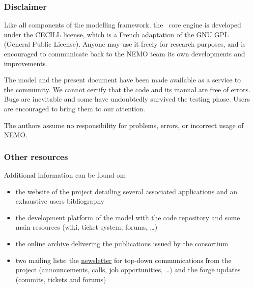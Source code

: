 
\thispagestyle{plain}

\subsubsection*{Disclaimer}

Like all components of the modelling framework,
the \engine~core engine is developed under the \href{http://www.cecill.info}{CECILL license},
which is a French adaptation of the GNU GPL (General Public License).
Anyone may use it freely for research purposes, and is encouraged to
communicate back to the NEMO team its own developments and improvements.

The model and the present document have been made available as a service to the community.
We cannot certify that the code and its manual are free of errors.
Bugs are inevitable and some have undoubtedly survived the testing phase.
Users are encouraged to bring them to our attention.

The authors assume no responsibility for problems, errors, or incorrect usage of NEMO.

\subsubsection*{Other resources}

Additional information can be found on:
\begin{itemize}
\item the \href{http://www.nemo-ocean.eu}{website} of the project detailing several
  associated applications and an exhaustive users bibliography
\item the \href{http://forge.ipsl.jussieu.fr/nemo}{development platform} of the model with
  the code repository and some main resources (wiki, ticket system, forums, \ldots)
\item the \href{http://zenodo.org/communities/nemo-ocean}{online archive}
  delivering the publications issued by the consortium
\item two mailing lists:
  the \href{http://listes.ipsl.fr/sympa/info/nemo-newsletter}{newsletter} for
  top-down communications from the project
  (announcements, calls, job opportunities, \ldots)
  and the \href{http://listes.ipsl.fr/sympa/info/nemo-forge}{forge updates}
  (commits, tickets and forums)
\end{itemize}

